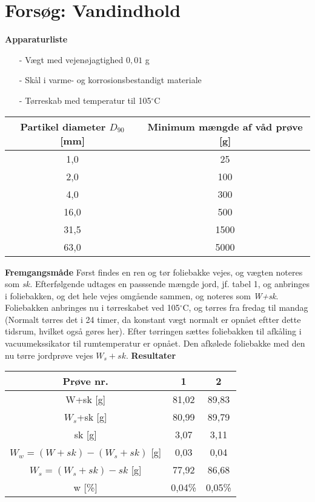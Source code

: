 \chapter{Forsøg: Vandindhold}

\textbf{Apparaturliste}
\begin{itemize}
\item[-] Vægt med vejenøjagtighed $0,\!01$ g
\item[-] Skål i varme- og korrosionsbestandigt materiale
\item[-] Tørreskab med temperatur til 105$^{\circ}$C
\end{itemize}

\begin{center}
	\begin{tabular}{ |c|c| } 
		\hline
		Partikel diameter $D_{90}$ [mm] & Minimum mængde af våd prøve [g] \\	\hline
		1,0 & 25 \\		\hline
		2,0 & 100 \\	\hline 
		4,0 & 300 \\ 	\hline
		16,0 & 500 \\	\hline
		31,5 & 1500 \\	\hline
		63,0 & 5000 \\	\hline	
	\end{tabular}
\end{center}

\textbf{Fremgangsmåde}
\newline
Først findes en ren og tør foliebakke vejes, og vægten noteres som \textit{sk.} Efterfølgende udtages en passsende mængde jord, jf. tabel 1, og anbringes i foliebakken, og det hele vejes omgående sammen, og noteres som \textit{W+sk}.
\newline
Foliebakken anbringes nu i tørreskabet ved 105$^{\circ}$C, og tørres fra fredag til mandag (Normalt tørres det i 24 timer, da konstant vægt normalt er opnået eftter dette tidsrum, hvilket også gøres her). Efter tørringen sættes foliebakken til afkåling i vacuumekssikator til rumtemperatur er opnået. Den afkølede foliebakke med den nu tørre jordprøve vejes \textit{$W_{s}+sk$}.
\newline
\newline
\textbf{Resultater}
\begin{center}
	\begin{tabular}{ |c|c|c| } 
		\hline
		Prøve nr. & 1 & 2 \\	\hline
		W+sk [g] & 81,02 & 89,83 \\	\hline
		$W_s$+sk [g] & 80,99 & 89,79 \\	\hline 
		sk [g] & 3,07 & 3,11 \\ \hline
		$W_w=(W+sk) - (W_s+sk)$ [g] & 0,03 & 0,04 \\	\hline
		$W_s=(W_s+sk) - sk$ [g] & 77,92 & 86,68 \\	\hline		
		w [\%] & 0,04\% & 0,05\% \\	\hline	
	\end{tabular}
\end{center}

